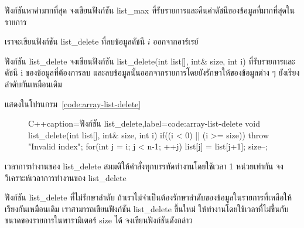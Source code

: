 \begin{quiz}{ฟังก์ชัน{\wbr}หา{\wbr}ค่า{\wbr}มาก{\wbr}ที่สุด}
จง{\wbr}เขียน{\wbr}ฟังก์ชัน {\ct list\_max} ที่{\wbr}รับ{\wbr}รายการ{\wbr}และ{\wbr}คืน{\wbr}ค่า{\wbr}ดัชนี{\wbr}ของ{\wbr}ข้อมูล{\wbr}ที่{\wbr}มาก{\wbr}ที่สุด{\wbr}ใน{\wbr}รายการ{\wbr}
\end{quiz}

เรา{\wbr}จะ{\wbr}เขียน{\wbr}ฟังก์ชัน {\ct list\_delete} ที่{\wbr}ลบ{\wbr}ข้อมูล{\wbr}ดัชนี $i$ ออก{\wbr}จาก{\wbr}อาร์เรย์  

\begin{quiz}{ฟังก์ชัน {\ct list\_delete}}
จง{\wbr}เขียน{\wbr}ฟังก์ชัน {\ct list\_delete(int list[], int\& size, int i)}
ที่{\wbr}รับ{\wbr}รายการ{\wbr}และ{\wbr}ดัชนี {\ct i} ของ{\wbr}ข้อมูล{\wbr}ที่{\wbr}ต้องการ{\wbr}ลบ{\wbr}
และ{\wbr}ลบ{\wbr}ข้อมูล{\wbr}นั้น{\wbr}ออก{\wbr}จาก{\wbr}รายการ{\wbr}โดย{\wbr}ยัง{\wbr}รักษา{\wbr}ให้{\wbr}ของ{\wbr}ข้อมูล{\wbr}ต่าง ๆ ยัง{\wbr}เรียงลำดับ{\wbr}กัน{\wbr}เหมือน{\wbr}เดิม{\wbr}
\end{quiz}
\begin{quizans}
แสดง{\wbr}ใน{\wbr}โปรแกรม~\ref{code:array-list-delete}
\end{quizans}

\begin{figure}
\latintext
\begin{codelist}{C++}{caption={\thaitext ฟังก์ชัน {\ct list\_delete}\latintext},label=code:array-list-delete}
void list_delete(int list[], int& size, int i)
{
  if((i < 0) || (i >= size))
    throw "Invalid index";
  for(int j = i; j < n-1; ++j)
    list[j] = list[j+1];
  size--;
}
\end{codelist}
\thaitext
\end{figure}

\begin{quiz}{เวลา{\wbr}การ{\wbr}ทำงาน{\wbr}ของ {\ct list\_delete}}
สมมติ{\wbr}ให้{\wbr}คำสั่ง{\wbr}ทุก{\wbr}บรรทัด{\wbr}ทำงาน{\wbr}โดย{\wbr}ใช้เวลา 1 หน่วย{\wbr}เท่า{\wbr}กัน จง{\wbr}วิเคราะห์{\wbr}เวลา{\wbr}การ{\wbr}ทำงาน{\wbr}ของ{\wbr}
{\ct list\_delete} 
\end{quiz}

\begin{quiz}{ฟังก์ชัน {\ct list\_delete} ที่{\wbr}ไม่{\wbr}รักษา{\wbr}ลำดับ}
ถ้า{\wbr}เรา{\wbr}ไม่{\wbr}จำเป็น{\wbr}ต้อง{\wbr}รักษา{\wbr}ลำดับ{\wbr}ของ{\wbr}ข้อมูล{\wbr}ใน{\wbr}รายการ{\wbr}ที่{\wbr}เหลือ{\wbr}ให้{\wbr}เรียง{\wbr}กัน{\wbr}เหมือน{\wbr}เดิม{\wbr}
เรา{\wbr}สามารถ{\wbr}เขียน{\wbr}ฟังก์ชัน {\ct list\_delete} ขึ้น{\wbr}ใหม่{\wbr}
ให้{\wbr}ทำงาน{\wbr}โดย{\wbr}ใช้เวลา{\wbr}ที่{\wbr}ไม่{\wbr}ขึ้น{\wbr}กับ{\wbr}ขนาด{\wbr}ของ{\wbr}รายการ{\wbr}ใน{\wbr}พารามิเตอร์ {\ct size} ได้{\wbr}
จง{\wbr}เขียน{\wbr}ฟังก์ชัน{\wbr}ดังกล่าว{\wbr}
\end{quiz}

